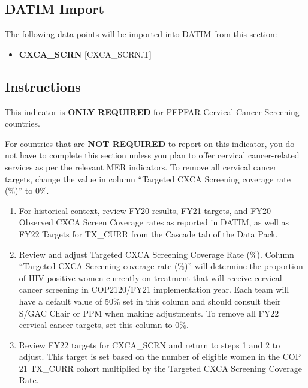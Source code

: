 \documentclass[
  openany]{book}
\providecommand{\tightlist}{%
  \setlength{\itemsep}{0pt}\setlength{\parskip}{0pt}}
\begin{document}
\hypertarget{datim-import-30}{%
\subsection{DATIM Import}\label{datim-import-30}}

The following data points will be imported into DATIM from this section:

\begin{itemize}
\tightlist
\item
  \textbf{CXCA\_SCRN} {[}CXCA\_SCRN.T{]}
\end{itemize}

\hypertarget{instructions-30}{%
\subsection{Instructions}\label{instructions-30}}

This indicator is \textbf{ONLY} \textbf{REQUIRED} for PEPFAR Cervical Cancer
Screening countries.

For countries that are \textbf{NOT REQUIRED} to report on this indicator, you
do not have to complete this section unless you plan to offer cervical
cancer-related services as per the relevant MER indicators. To remove
all cervical cancer targets, change the value in column ``Targeted CXCA
Screening coverage rate (\%)'' to 0\%.

\begin{enumerate}
\def\labelenumi{\arabic{enumi}.}
\item
  For historical context, review FY20 results, FY21 targets, and FY20
  Observed CXCA Screen Coverage rates as reported in DATIM, as well as
  FY22 Targets for TX\_CURR from the Cascade tab of the Data Pack.
\item
  Review and adjust Targeted CXCA Screening Coverage Rate (\%). Column
  ``Targeted CXCA Screening coverage rate (\%)'' will determine the
  proportion of HIV positive women currently on treatment that will
  receive cervical cancer screening in COP2120/FY21 implementation
  year. Each team will have a default value of 50\% set in this column
  and should consult their S/GAC Chair or PPM when making adjustments.
  To remove all FY22 cervical cancer targets, set this column to 0\%.
\item
  Review FY22 targets for CXCA\_SCRN and return to steps 1 and 2 to
  adjust. This target is set based on the number of eligible women in
  the COP 21 TX\_CURR cohort multiplied by the Targeted CXCA Screening
  Coverage Rate.
\end{enumerate}
\end{document}
